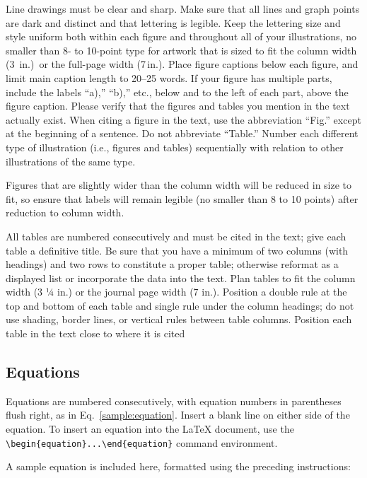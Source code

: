 \documentclass[journal ]{new-aiaa}
\begin{document}
Line drawings must be clear and sharp. Make sure that all lines and graph points are dark and distinct and that lettering is legible. Keep the lettering size and style uniform both within each figure and throughout all of your illustrations, no smaller than 8- to 10-point type for artwork that is sized to fit the column width (3\,\textonequarter{} in.)~or the full-page width (7\,in.). Place figure captions below each figure, and limit main caption length to 20--25 words. If your figure has multiple parts, include the labels “a),” “b),” etc., below and to the left of each part, above the figure caption. Please verify that the figures and tables you mention in the text actually exist. When citing a figure in the text, use the abbreviation “Fig.” except at the beginning of a sentence. Do not abbreviate “Table.” Number each different type of illustration (i.e., figures and tables) sequentially with relation to other illustrations of the same type.

Figures that are slightly wider than the column width will be reduced in size to fit, so ensure that labels will remain legible (no smaller than 8 to 10 points) after reduction to column width. 

All tables are numbered consecutively and must be cited in the text; give each table a definitive title. Be sure that you have a minimum of two columns (with headings) and two rows to constitute a proper table; otherwise reformat as a displayed list or incorporate the data into the text. Plan tables to fit the column width (3 ¼ in.) or the journal page width (7 in.). Position a double rule at the top and bottom of each table and single rule under the column headings; do not use shading, border lines, or vertical rules between table columns. Position each table in the text close to where it is cited


\subsection{Equations}
Equations are numbered consecutively, with equation numbers in parentheses flush right, as in Eq.~\eqref{sample:equation}. Insert a blank line on either side of the equation. To insert an equation into the \LaTeX{} document, use the \verb|\begin{equation}...\end{equation}| command environment.

A sample equation is included here, formatted using the preceding instructions:
\end{document}
